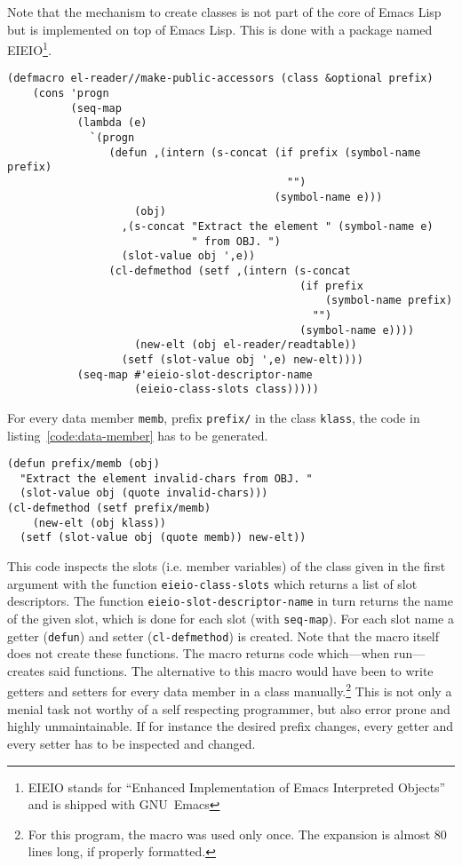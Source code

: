 \documentclass[a4paper,10pt,twoside]{report}
\newcommand{\el}{Emacs Lisp}
\newcommand{\sym}[1]{\texttt{#1}}
\newcommand{\fun}[1]{\texttt{#1}}
\newcommand{\emacs}{GNU~Emacs}
\begin{document}
Note that the mechanism to create classes is not part of the core of \el{} but
is implemented on top of \el{}.  This is done with a package named
EIEIO\footnote{EIEIO stands for “Enhanced Implementation of Emacs Interpreted
  Objects” and is shipped with \emacs{}}.\cite{eieio}

\begin{lstlisting}[style=lispcode,caption={Create accessors for all data members
  of a given class.},label={code:make-accessors}]
(defmacro el-reader//make-public-accessors (class &optional prefix)
    (cons 'progn
          (seq-map
           (lambda (e)
             `(progn
                (defun ,(intern (s-concat (if prefix (symbol-name prefix)
                                            "")
                                          (symbol-name e)))
                    (obj)
                  ,(s-concat "Extract the element " (symbol-name e)
                             " from OBJ. ")
                  (slot-value obj ',e))
                (cl-defmethod (setf ,(intern (s-concat
                                              (if prefix
                                                  (symbol-name prefix)
                                                "")
                                              (symbol-name e))))
                    (new-elt (obj el-reader/readtable))
                  (setf (slot-value obj ',e) new-elt))))
           (seq-map #'eieio-slot-descriptor-name
                    (eieio-class-slots class)))))
\end{lstlisting}

For every data member \sym{memb}, prefix \sym{prefix/} in the class \sym{klass},
the code in listing~\ref{code:data-member} has to be generated.

\begin{lstlisting}[style=lispcode,caption={Getter and Setter for a member called
  \sym{memb}.},label={code:data-member}]
(defun prefix/memb (obj)
  "Extract the element invalid-chars from OBJ. "
  (slot-value obj (quote invalid-chars)))
(cl-defmethod (setf prefix/memb)
    (new-elt (obj klass))
  (setf (slot-value obj (quote memb)) new-elt))
\end{lstlisting}

This code inspects the slots (i.e. member variables) of the class given in the
first argument with the function \fun{eieio-class-slots} which returns a list of
slot descriptors.  The function \fun{eieio-slot-descriptor-name} in turn returns
the name of the given slot, which is done for each slot (with \fun{seq-map}).
For each slot name a getter (\fun{defun}) and setter (\fun{cl-defmethod}) is
created.  Note that the macro itself does not create these functions.  The macro
returns code which---when run---creates said functions.  The alternative to this
macro would have been to write getters and setters for every data member in a
class manually.\footnote{For this program, the macro was used only once.  The
  expansion is almost 80 lines long, if properly formatted.}  This is not only a
menial task not worthy of a self respecting programmer, but also error prone and
highly unmaintainable.  If for instance the desired prefix changes, every getter
and every setter has to be inspected and changed.
\end{document}

